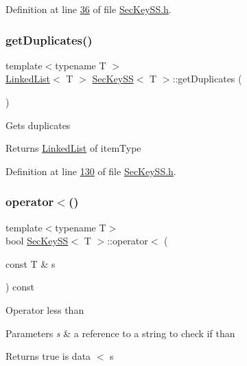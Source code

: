 Definition at line \hyperlink{SecKeySS_8h_source_l00036}{36} of file \hyperlink{SecKeySS_8h_source}{Sec\+Key\+S\+S.\+h}.

\mbox{\label{classSecKeySS_abef7c9c03e9bc6b818d599966428fdec}} 
\subsubsection{\texorpdfstring{get\+Duplicates()}{getDuplicates()}}
{\footnotesize\ttfamily template$<$typename T $>$ \\
\hyperlink{classLinkedList}{Linked\+List}$<$ T $>$ \hyperlink{classSecKeySS}{Sec\+Key\+SS}$<$ T $>$\+::get\+Duplicates (\begin{DoxyParamCaption}{ }\end{DoxyParamCaption})}

Gets duplicates \begin{DoxyReturn}{Returns}
\hyperlink{classLinkedList}{Linked\+List} of item\+Type 
\end{DoxyReturn}


Definition at line \hyperlink{SecKeySS_8h_source_l00130}{130} of file \hyperlink{SecKeySS_8h_source}{Sec\+Key\+S\+S.\+h}.

\mbox{\label{classSecKeySS_a4a77c5d5b609ef01c17f82001e9f1a7b}} 
\subsubsection{\texorpdfstring{operator$<$()}{operator<()}\hspace{0.1cm}{\footnotesize\ttfamily [1/2]}}
{\footnotesize\ttfamily template$<$typename T$>$ \\
bool \hyperlink{classSecKeySS}{Sec\+Key\+SS}$<$ T $>$\+::operator$<$ (\begin{DoxyParamCaption}\item[{const T \&}]{s }\end{DoxyParamCaption}) const\hspace{0.3cm}{\ttfamily [inline]}}

Operator less than 
\begin{DoxyParams}{Parameters}
{\em s} & a reference to a string to check if than \\
\hline
\end{DoxyParams}
\begin{DoxyReturn}{Returns}
true is data $<$ s 
\end{DoxyReturn}


